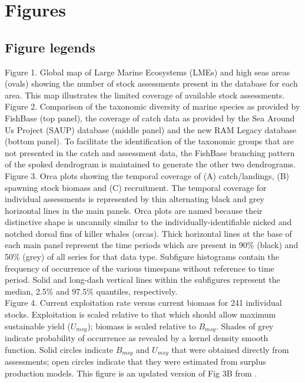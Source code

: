 \section*{Figures}
\subsection*{Figure legends}

\noindent Figure 1. Global map of Large Marine Ecosystems (LMEs) and
high seas areas (ovals) showing the number of stock assessments
present in the database for each area. This map illustrates the limited
coverage of available stock assessments.\\

\noindent Figure 2. Comparison of the taxonomic diversity of marine
species as provided by FishBase (top panel), the coverage of catch
data as provided by the Sea Around Us Project (SAUP) database (middle
panel) and the new RAM Legacy database (bottom panel). To facilitate the
identification of the taxonomic groups that are not presented in the catch
and assessment data, the FishBase branching pattern of the spoked dendrogram is
maintained to generate the other two dendrograms.\\ 

\noindent Figure 3. Orca plots showing the temporal coverage of (A)
catch/landings, (B) spawning stock biomass and (C) recruitment. The
temporal coverage for individual assessments is represented by thin
alternating black and grey horizontal lines in the main panels. Orca
plots are named because their distinctive shape is uncannily similar
to the individually-identifiable nicked and notched dorsal fins of
killer whales (orcas). Thick horizontal lines at the base of each main
panel represent the time periods which are present in 90\% (black) and
50\% (grey) of all series for that data type.  Subfigure histograms
contain the frequency of occurrence of the various timespans without
reference to time period. Solid and long-dash vertical lines within
the subfigures represent the median,
2.5\% and 97.5\% quantiles, respectively.\\

\noindent Figure 4. Current exploitation rate versus current biomass
for 241 individual stocks. Exploitation is scaled relative to that
which should allow maximum sustainable yield ($U_{msy}$); biomass is
scaled relative to $B_{msy}$. Shades of grey indicate probability of
occurrence as revealed by a kernel density smooth function. Solid
circles indicate $B_{msy}$ and $U_{msy}$ that were obtained directly
from assessments; open circles indicate that they were estimated from
surplus production models. This figure is an updated version of Fig 3B
from \citet{Worm:etal:2009:science}.
\\

